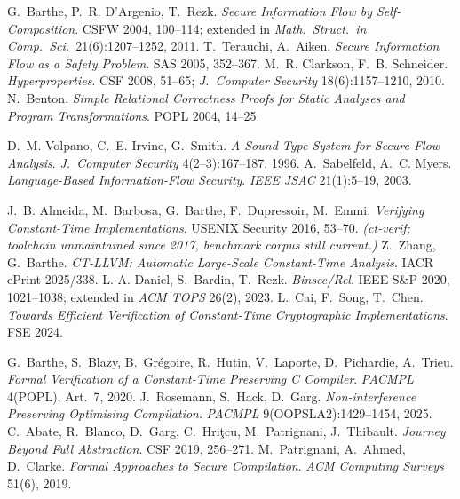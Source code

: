 \begingroup
\small
\begin{description}[leftmargin=1.2em,style=unboxed,itemsep=2pt]

\item[Self-composition and 2-safety.]
G.~Barthe, P.~R. D'Argenio, T.~Rezk. \emph{Secure Information Flow by
Self-Composition}. CSFW 2004, 100--114; extended in \emph{Math.\ Struct.\ in
Comp.\ Sci.}\ 21(6):1207--1252, 2011.\quad
T.~Terauchi, A.~Aiken. \emph{Secure Information Flow as a Safety Problem}. SAS
2005, 352--367.\quad
M.~R. Clarkson, F.~B. Schneider. \emph{Hyperproperties}. CSF 2008, 51--65;
\emph{J.\ Computer Security} 18(6):1157--1210, 2010.\quad
N.~Benton. \emph{Simple Relational Correctness Proofs for Static Analyses and
Program Transformations}. POPL 2004, 14--25.

\item[Information-flow type systems.]
D.~M. Volpano, C.~E. Irvine, G.~Smith. \emph{A Sound Type System for Secure Flow
Analysis}. \emph{J.\ Computer Security} 4(2--3):167--187, 1996.\quad
A.~Sabelfeld, A.~C. Myers. \emph{Language-Based Information-Flow Security}.
\emph{IEEE JSAC} 21(1):5--19, 2003.

\item[Constant-time verification.]
J.~B. Almeida, M.~Barbosa, G.~Barthe, F.~Dupressoir, M.~Emmi. \emph{Verifying
Constant-Time Implementations}. USENIX Security 2016, 53--70. \emph{(ct-verif;
toolchain unmaintained since 2017, benchmark corpus still current.)}\quad
Z.~Zhang, G.~Barthe. \emph{CT-LLVM: Automatic Large-Scale Constant-Time
Analysis}. IACR ePrint 2025/338.\quad
L.-A. Daniel, S.~Bardin, T.~Rezk. \emph{Binsec/Rel}. IEEE S\&P 2020, 1021--1038;
extended in \emph{ACM TOPS} 26(2), 2023.\quad
L.~Cai, F.~Song, T.~Chen. \emph{Towards Efficient Verification of Constant-Time
Cryptographic Implementations}. FSE 2024.

\item[Compiler preservation of hyperproperties.]
G.~Barthe, S.~Blazy, B.~Gr\'egoire, R.~Hutin, V.~Laporte, D.~Pichardie,
A.~Trieu. \emph{Formal Verification of a Constant-Time Preserving C Compiler}.
\emph{PACMPL} 4(POPL), Art.~7, 2020.\quad
J.~Rosemann, S.~Hack, D.~Garg. \emph{Non-interference Preserving Optimising
Compilation}. \emph{PACMPL} 9(OOPSLA2):1429--1454, 2025.\quad
C.~Abate, R.~Blanco, D.~Garg, C.~Hri\c{t}cu, M.~Patrignani, J.~Thibault.
\emph{Journey Beyond Full Abstraction}. CSF 2019, 256--271.\quad
M.~Patrignani, A.~Ahmed, D.~Clarke. \emph{Formal Approaches to Secure
Compilation}. \emph{ACM Computing Surveys} 51(6), 2019.


\end{description}

